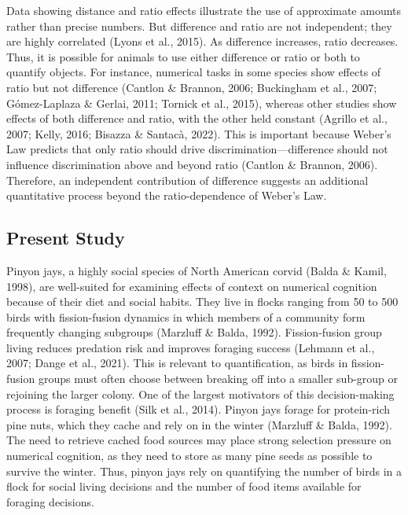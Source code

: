 \documentclass[
  ,pub,floatsintext]{apa6}
\begin{document}
Data showing distance and ratio effects illustrate the use of approximate amounts rather than precise numbers. But difference and ratio are not independent; they are highly correlated (Lyons et al., 2015). As difference increases, ratio decreases. Thus, it is possible for animals to use either difference or ratio or both to quantify objects. For instance, numerical tasks in some species show effects of ratio but not difference (Cantlon \& Brannon, 2006; Buckingham et al., 2007; Gómez-Laplaza \& Gerlai, 2011; Tornick et al., 2015), whereas other studies show effects of both difference and ratio, with the other held constant (Agrillo et al., 2007; Kelly, 2016; Bisazza \& Santacà, 2022). This is important because Weber's Law predicts that only ratio should drive discrimination---difference should not influence discrimination above and beyond ratio (Cantlon \& Brannon, 2006). Therefore, an independent contribution of difference suggests an additional quantitative process beyond the ratio-dependence of Weber's Law.

\hypertarget{present-study}{%
\subsection{Present Study}\label{present-study}}

Pinyon jays, a highly social species of North American corvid (Balda \& Kamil, 1998), are well-suited for examining effects of context on numerical cognition because of their diet and social habits. They live in flocks ranging from 50 to 500 birds with fission-fusion dynamics in which members of a community form frequently changing subgroups (Marzluff \& Balda, 1992). Fission-fusion group living reduces predation risk and improves foraging success (Lehmann et al., 2007; Dange et al., 2021). This is relevant to quantification, as birds in fission-fusion groups must often choose between breaking off into a smaller sub-group or rejoining the larger colony. One of the largest motivators of this decision-making process is foraging benefit (Silk et al., 2014). Pinyon jays forage for protein-rich pine nuts, which they cache and rely on in the winter (Marzluff \& Balda, 1992). The need to retrieve cached food sources may place strong selection pressure on numerical cognition, as they need to store as many pine seeds as possible to survive the winter. Thus, pinyon jays rely on quantifying the number of birds in a flock for social living decisions and the number of food items available for foraging decisions.
\end{document}
